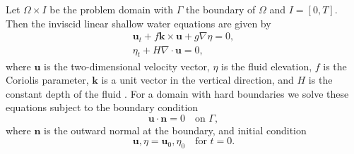 Let $\Omega \times I$ be the problem domain with $\Gamma$ the boundary of
$\Omega$ and $I = [0, T]$.  Then the inviscid linear shallow water equations are
given by 
\begin{equation}
  \begin{split}
    \mathbf{u}_t + f\mathbf{k} \times \mathbf{u} + g \nabla \eta = 0, \\
    \eta_t + H \nabla\cdot \mathbf{u} = 0,
  \end{split}
  \label{eqn:SWE}
\end{equation}
where $\mathbf{u}$ is the two-dimensional velocity vector, $\eta$ is the
fluid elevation, $f$ is the Coriolis parameter, $\mathbf{k}$ is a unit
vector in the vertical direction, and $H$ is the constant depth of the fluid
\cite{Hanert2004, LeBlond1981, Le-Roux1998}.  For a domain with hard boundaries
we solve these equations subject to the boundary condition
\begin{equation}
  \mathbf{u}\cdot \mathbf{n} = 0 \quad \text{on } \Gamma,
  \label{eqn:BCs}
\end{equation}
where $\mathbf{n}$ is the outward normal at the boundary,
and initial condition
\begin{equation}
  \mathbf{u}, \eta = \mathbf{u}_0, \eta_0 \quad \text{for } t = 0.
  \label{eqn:IC}
\end{equation}

